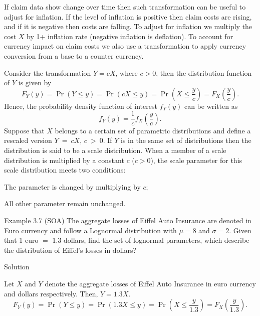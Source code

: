 \documentclass[]{book}
\theoremstyle{definition}
\theoremstyle{definition}
\theoremstyle{definition}
\theoremstyle{remark}
\begin{document}
If claim data show change over time then such transformation can be
useful to adjust for inflation. If the level of inflation is positive
then claim costs are rising, and if it is negative then costs are
falling. To adjust for inflation we multiply the cost \(X\) by 1+
inflation rate (negative inflation is deflation). To account for
currency impact on claim costs we also use a transformation to apply
currency conversion from a base to a counter currency.

Consider the transformation \(Y = cX\), where \(c > 0\), then the
distribution function of \(Y\) is given by
\[F_{Y}\left( y \right) = \Pr\left( Y \leq y \right) = \Pr\left( cX \leq y \right) = \Pr\left( X \leq \frac{y}{c} \right) = F_{X}\left( \frac{y}{c} \right).\]
Hence, the probability density function of interest \(f_{Y}(y)\) can be
written as
\[f_{Y}\left( y \right) = \frac{1}{c}f_{X}\left( \frac{y}{c} \right).\]
Suppose that \(X\) belongs to a certain set of parametric distributions
and define a rescaled version \(Y\  = \ cX\), \(c\  > \ 0\). If \(Y\) is
in the same set of distributions then the distribution is said to be a
scale distribution. When a member of a scale distribution is multiplied
by a constant \(c\) (\(c > 0\)), the scale parameter for this scale
distribution meets two conditions:

The parameter is changed by multiplying by \(c\);

All other parameter remain unchanged.

Example 3.7 (SOA) The aggregate losses of Eiffel Auto Insurance are
denoted in Euro currency and follow a Lognormal distribution with
\(\mu = 8\) and \(\sigma = 2\). Given that 1 euro \(=\) 1.3 dollars,
find the set of lognormal parameters, which describe the distribution of
Eiffel's losses in dollars?

Solution

Let \(X\) and \(Y\) denote the aggregate losses of Eiffel Auto Insurance
in euro currency and dollars respectively. Then, \(Y = 1.3X\).
\[F_{Y}\left( y \right) = \Pr\left( Y \leq y \right) = \Pr\left( 1.3X \leq y \right) = \Pr\left( X \leq \frac{y}{1.3} \right) = F_{X}\left( \frac{y}{1.3} \right).\]
\end{document}
